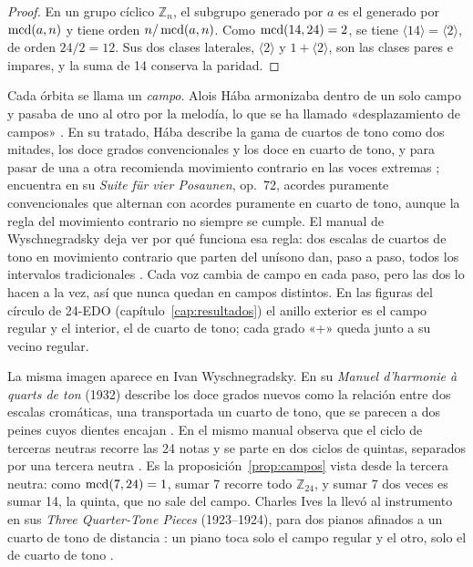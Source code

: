 \begin{proof}
En un grupo cíclico $\mathbb{Z}_n$, el subgrupo generado por $a$ es el generado por $\operatorname{mcd}(a, n)$ y tiene orden
$n / \operatorname{mcd}(a, n)$. Como $\operatorname{mcd}(14, 24) = 2$, se tiene $\langle 14 \rangle = \langle 2 \rangle$, de orden $24/2 = 12$. Sus
dos clases laterales, $\langle 2 \rangle$ y $1 + \langle 2 \rangle$, son las clases pares e impares, y la suma de 14
conserva la paridad.
\end{proof}

Cada órbita se llama un \emph{campo}. Alois Hába armonizaba dentro de un solo campo y pasaba de uno al otro por la
melodía, lo que se ha llamado «desplazamiento de campos» \citep{little2019}. En su tratado, Hába describe la gama de
cuartos de tono como dos mitades, los doce grados convencionales y los doce en cuarto de tono, y para pasar de una a otra
recomienda movimiento contrario en las voces extremas \citep[cap.~II]{haba1927}; \citet[cap.~3]{skinner2006} encuentra en
su \emph{Suite für vier Posaunen}, op.~72, acordes puramente convencionales que alternan con acordes puramente en cuarto
de tono, aunque la regla del movimiento contrario no siempre se cumple. El manual de Wyschnegradsky deja ver por qué
funciona esa regla: dos escalas de cuartos de tono en movimiento contrario que parten del unísono dan, paso a paso, todos
los intervalos tradicionales \citep[§11, p.~6]{wyschnegradsky2017}. Cada voz cambia de campo en cada paso, pero las dos lo
hacen a la vez, así que nunca quedan en campos distintos. En las figuras del círculo de 24-EDO
(capítulo~\ref{cap:resultados}) el anillo exterior es el campo regular y el interior, el de cuarto de tono; cada grado
«+» queda junto a su vecino regular.

La misma imagen aparece en Ivan Wyschnegradsky. En su \emph{Manuel d'harmonie à quarts de ton} (1932) describe los doce
grados nuevos como la relación entre dos escalas cromáticas, una transportada un cuarto de tono, que se parecen a dos
peines cuyos dientes encajan \citep[§3, p.~1]{wyschnegradsky2017}. En el mismo manual observa que el ciclo de terceras
neutras recorre las 24 notas y se parte en dos ciclos de quintas, separados por una tercera neutra
\citep[§10, p.~5]{wyschnegradsky2017}. Es la proposición~\ref{prop:campos} vista desde la tercera neutra: como
$\operatorname{mcd}(7, 24) = 1$, sumar 7 recorre todo $\mathbb{Z}_{24}$, y sumar 7 dos veces es sumar 14, la quinta, que no sale del
campo. Charles Ives la llevó al instrumento en sus \emph{Three Quarter-Tone Pieces}
(1923--1924), para dos pianos afinados a un cuarto de tono de distancia \citep{ives1968}: un piano toca solo el campo
regular y el otro, solo el de cuarto de tono \citep{flynn2025}.

